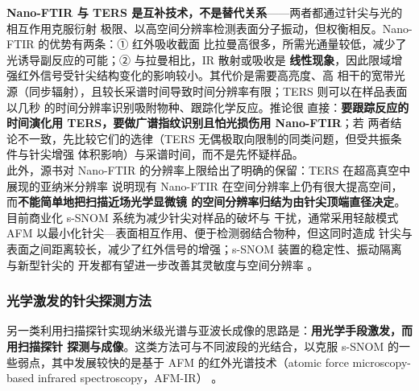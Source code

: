 \begin{crosscheck}
\textbf{Nano-FTIR 与 TERS 是互补技术，不是替代关系}——两者都通过针尖与光的相互作用克服衍射
极限、以高空间分辨率检测表面分子振动，但权衡相反。Nano-FTIR 的优势有两条：① 红外吸收截面
比拉曼高很多，所需光通量较低，减少了光诱导副反应的可能；② 与拉曼相比，IR 散射或吸收是
\textbf{线性现象}，因此限域增强红外信号受针尖结构变化的影响较小。其代价是需要高亮度、高
相干的宽带光源（同步辐射），且较长采谱时间导致时间分辨率有限；TERS 则可以在样品表面以几秒
的时间分辨率识别吸附物种、跟踪化学反应。推论很
直接：\textbf{要跟踪反应的时间演化用 TERS，要做广谱指纹识别且怕光损伤用 Nano-FTIR}；若
两者结论不一致，先比较它们的选律（TERS 无偶极取向限制的同类问题，但受共振条件与针尖增强
体积影响）与采谱时间，而不是先怀疑样品。\\
此外，源书对 Nano-FTIR 的分辨率上限给出了明确的保留：TERS 在超高真空中展现的亚纳米分辨率
说明现有 Nano-FTIR 在空间分辨率上仍有很大提高空间，而\textbf{不能简单地把扫描近场光学显微镜
的空间分辨率归结为由针尖顶端直径决定}。目前商业化 s-SNOM 系统为减少针尖对样品的破坏与
干扰，通常采用轻敲模式 AFM 以最小化针尖—表面相互作用、便于检测弱结合物种，但这同时造成
针尖与表面之间距离较长，减少了红外信号的增强；s-SNOM 装置的稳定性、振动隔离与新型针尖的
开发都有望进一步改善其灵敏度与空间分辨率
。
\end{crosscheck}

\subsubsection{光学激发的针尖探测方法}
\label{ssec:afmir}

另一类利用扫描探针实现纳米级光谱与亚波长成像的思路是：\textbf{用光学手段激发，而用扫描探针
探测与成像}。这类方法可与不同波段的光结合，以克服 s-SNOM 的一些弱点，其中发展较快的是基于
AFM 的红外光谱技术（atomic force microscopy-based infrared spectroscopy，AFM-IR）
。

